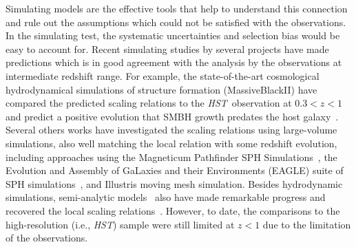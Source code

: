 \documentclass{natureprintstyle}
\newcommand{\hst}{{\it HST}}
\newcommand{\mbh}{$\mathcal M_{\rm BH}$}
\begin{document}
Simulating models are the effective tools that help to understand this connection and rule out the assumptions which could not be satisfied with the observations. In the simulating test, the systematic uncertainties and selection bias would be easy to account for. Recent simulating studies by several projects have made predictions which is in good agreement with the analysis by the observations at intermediate redshift range. For example, the state-of-the-art cosmological hydrodynamical simulations of structure formation (MassiveBlackII) have compared the predicted scaling relations to the \hst\ observation at $0.3<z<1$ and predict a positive evolution that SMBH growth predates the host galaxy~\cite{DeG++15}. Several others works have investigated the scaling relations using large-volume simulations, also well matching the local relation with some redshift evolution, including approaches using the Magneticum Pathfinder SPH Simulations~\cite{Steinborn2015}, the Evolution and Assembly of GaLaxies and their Environments (EAGLE) suite of SPH simulations~\cite{Schaye2015}, and Illustris moving mesh simulation\cite{Sijacki2015, Vogelsberger2014}. Besides hydrodynamic simulations, semi-analytic models~\cite{Menci2014, Menci2016} also have made remarkable progress and recovered the local scaling relations~\cite{Kormendy13}. However, to date, the comparisons to the high-resolution (i.e., \hst) sample were still limited at $z<1$ due to the limitation of the observations.

\end{document}
